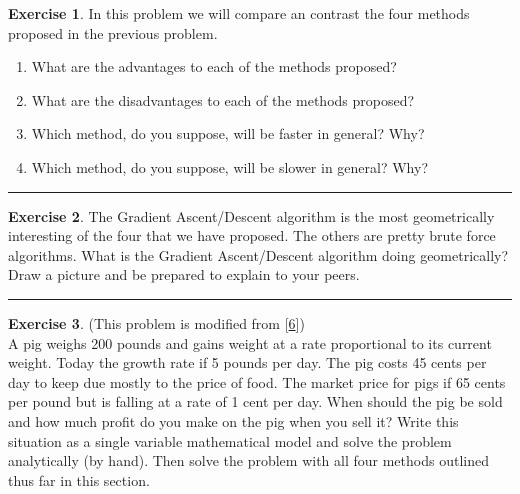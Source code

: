 \documentclass[
]{book}
\theoremstyle{definition}
\theoremstyle{definition}
\theoremstyle{definition}
\newtheorem{exercise}{Exercise}[chapter]
\theoremstyle{remark}
\begin{document}
\begin{exercise}
\protect\hypertarget{exr:unnamed-chunk-200}{}{\label{exr:unnamed-chunk-200} }In this problem we will compare an contrast the four methods proposed in
the previous problem.

\begin{enumerate}
\def\labelenumi{\alph{enumi}.}
\item
  What are the advantages to each of the methods proposed?
\item
  What are the disadvantages to each of the methods proposed?
\item
  Which method, do you suppose, will be faster in general? Why?
\item
  Which method, do you suppose, will be slower in general? Why?
\end{enumerate}
\end{exercise}

\begin{center}\rule{0.5\linewidth}{0.5pt}\end{center}

\begin{exercise}
\protect\hypertarget{exr:unnamed-chunk-201}{}{\label{exr:unnamed-chunk-201} }The Gradient Ascent/Descent algorithm is the most geometrically
interesting of the four that we have proposed. The others are pretty
brute force algorithms. What is the Gradient Ascent/Descent algorithm
doing geometrically? Draw a picture and be prepared to explain to your
peers.
\end{exercise}

\begin{center}\rule{0.5\linewidth}{0.5pt}\end{center}

\begin{exercise}
\protect\hypertarget{exr:pig-numerical}{}{\label{exr:pig-numerical} }(This problem is modified from {[}\protect\hyperlink{ref-meerschaert}{6}{]})\\
A pig weighs 200 pounds and gains weight at a rate proportional to its
current weight. Today the growth rate if 5 pounds per day. The pig costs
45 cents per day to keep due mostly to the price of food. The market
price for pigs if 65 cents per pound but is falling at a rate of 1 cent
per day. When should the pig be sold and how much profit do you make on
the pig when you sell it? Write this situation as a single variable
mathematical model and solve the problem analytically (by hand). Then
solve the problem with all four methods outlined thus far in this
section.
\end{exercise}
\end{document}
